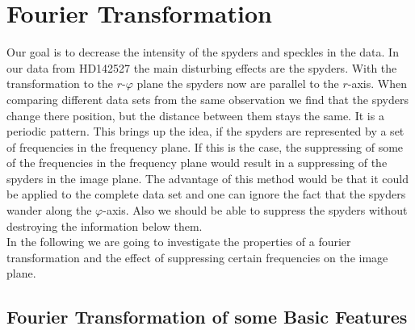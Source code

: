\section{Fourier Transformation}
Our goal is to decrease the intensity of the spyders and speckles in the data. In our data from HD142527 the main disturbing effects are the spyders. With the transformation to the $r$-$\varphi$ plane the spyders now are parallel to the $r$-axis. When comparing different data sets from the same observation we find that the spyders change there position, but the distance between them stays the same. It is a periodic pattern. This brings up the idea, if the spyders are represented by a set of frequencies in the frequency plane. If this is the case, the suppressing of some of the frequencies in the frequency plane would result in a suppressing of the spyders in the image plane. The advantage of this method would be that it could be applied to the complete data set and one can ignore the fact that the spyders wander along the $\varphi$-axis. Also we should be able to suppress the spyders without destroying the information below them.\\
In the following we are going to investigate the properties of a fourier transformation and the effect of suppressing certain frequencies on the image plane.\\

\subsection{Fourier Transformation of some Basic Features}

